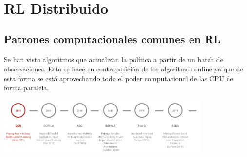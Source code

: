 \chapter{RL Distribuido}%
\label{cha:rl_distribuido}


\section{Patrones computacionales comunes en RL}%
\label{sec:patrones_computacionales_comunes_en_rl}

Se han visto algoritmos que actualizan la política a partir de un batch de observaciones. Esto
se hace en contraposición de los algoritmos online ya que de esta forma se está aprovechando
todo el poder computacional de las CPU de forma paralela.

\begin{center}
\includegraphics[width=0.8\textwidth]{figures/2020-07-13-141912_981x267_scrot.png}
\end{center}

